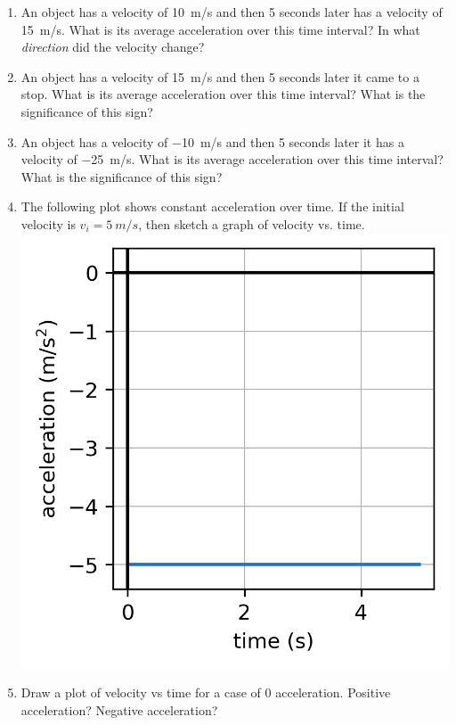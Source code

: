 \begin{enumerate}
\item An object has a velocity of \SI{10}{m/s} and then 5 seconds later has a velocity of \SI{15}{m/s}. What is its average acceleration over this time interval? In what \emph{direction} did the velocity change? \bigskip

\item An object has a velocity of \SI{15}{m/s} and then 5 seconds later it came to a stop. What is its average acceleration over this time interval? What is the significance of this sign? \hugeskip

\item An object has a velocity of \SI{-10}{m/s} and then 5 seconds later it has a velocity of \SI{-25}{m/s}. What is its average acceleration over this time interval? What is the significance of this sign? \bigskip

\item The following plot shows constant acceleration over time. If the initial velocity is $v_i=\SI{5}{m/s}$, then sketch a graph of velocity vs. time. \\
\includegraphics[]{week4-a1-t.png} 

\item
Draw a plot of velocity vs time for a case of 0 acceleration. Positive acceleration? Negative acceleration? \bigskip


\end{enumerate}
